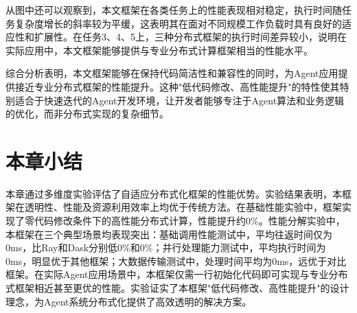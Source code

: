从图中还可以观察到，本文框架在各类任务上的性能表现相对稳定，执行时间随任务复杂度增长的斜率较为平缓，这表明其在面对不同规模工作负载时具有良好的适应性和扩展性。在任务3、4、5上，三种分布式框架的执行时间差异较小，说明在实际应用中，本文框架能够提供与专业分布式计算框架相当的性能水平。

综合分析表明，本文框架能够在保持代码简洁性和兼容性的同时，为Agent应用提供接近专业分布式框架的性能提升。这种"低代码修改、高性能提升"的特性使其特别适合于快速迭代的Agent开发环境，让开发者能够专注于Agent算法和业务逻辑的优化，而非分布式实现的复杂细节。

\section{本章小结}

本章通过多维度实验评估了自适应分布式化框架的性能优势。实验结果表明，本框架在透明性、性能及资源利用效率上均优于传统方法。在基础性能实验中，框架实现了零代码修改条件下的高性能分布式计算，性能提升约0\%。性能分解实验中，本框架在三个典型场景均表现突出：基础调用性能测试中，平均往返时间仅为0ms，比Ray和Dask分别低0\%和0\%；并行处理能力测试中，平均执行时间为0ms，明显优于其他框架；大数据传输测试中，处理时间平均为0ms，远优于对比框架。在实际Agent应用场景中，本框架仅需一行初始化代码即可实现与专业分布式框架相近甚至更优的性能。实验证实了本框架"低代码修改、高性能提升"的设计理念，为Agent系统分布式化提供了高效透明的解决方案。
